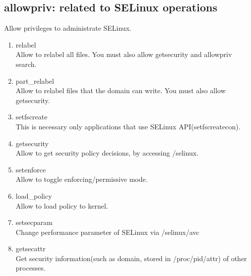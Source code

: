 \documentclass{article}
\begin{document}
\subsection{allowpriv: related to SELinux operations}
       Allow privileges to administrate SELinux.
       \begin{enumerate}
	\item relabel\\
	      Allow to relabel all files. You must also allow
	      getsecurity and allowpriv search.
	\item part\_relabel\\
	      Allow to relabel files that the domain can write. You must
	      also allow getsecurity. 
	\item setfscreate\\
	      This is necessary only applications that use SELinux API(setfscreatecon).
	\item getsecurity\\
	      Allow to get security policy decisions, by accessing /selinux.
	\item setenforce\\        
	      Allow to toggle enforcing/permissive mode.
	\item load\_policy\\                    
	      Allow to load policy to kernel.
	\item setsecparam\\
	      Change performance parameter of SELinux via /selinux/avc
	\item getsecattr\\
	      Get security information(such as domain, stored in /proc/pid/attr) of other processes.
       \end{enumerate}
\end{document}
